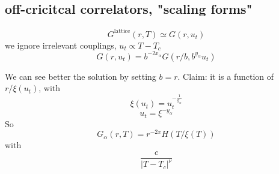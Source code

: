 \documentclass[a4paper]{book}
\theoremstyle{definition}
\theoremstyle{remark}
\begin{document}
\subsection{off-cricitcal correlators, "scaling forms"}

\begin{equation}
    G^{\text{lattice}}(r, T) \simeq G(r, u_t)
\end{equation}
we ignore irrelevant couplings, $u_t \propto T- T_c$
\begin{equation}
    G(r, u_t) = b^{-2x_\alpha}G(r/b, b^{y_\alpha}u_t)
\end{equation}

We can see better the solution by setting $b=r$. Claim: it is a function of $r/\xi(u_t)$, with 
\begin{equation}
    \xi(u_t) = u_t^{-\frac{1}{y_\alpha}}
\end{equation}
\begin{equation}
    u_t = \xi ^{-y_\alpha}
\end{equation}
So 
\begin{equation}
    G_\alpha (r, T) = r^{-2x}H(T/\xi(T))
\end{equation}
with 
\begin{equation}
    \frac{c}{|T-T_c|^\nu}
\end{equation}
\end{document}
